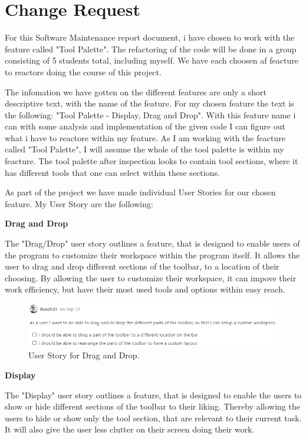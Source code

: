 \section{Change Request}
For this Software Maintenance report document, i have chosen to work with the feature called "Tool Palette".
The refactoring of the code will be done in a group consisting of 5 students total, including myself. We have each choosen af feacture to reactore doing the course of this project.

The infomation we have gotten on the different features are only a short descriptive text, with the name of the feature. For my chosen feature the text is the following: "Tool Palette - Display, Drag and Drop".
With this feature name i can with some analysis and implementation of the given code I can figure out what i have to reactore within my feature.
As I am working with the feacture called "Tool Palette", I will assume the whole of the tool palette is within my feacture. The tool palette after inspection looks to contain
tool sections, where it has different tools that one can select within these sections.

As part of the project we have made individual User Stories for our chosen feature. My User Story are the following:

\textbf{Drag and Drop}

The "Drag/Drop" user story outlines a feature, that is designed to enable users of the program to customize their workspace within the program itself.
It allows the user to drag and drop different sections of the toolbar, to a location of their choosing.
By allowing the user to customize their workspace, it can impove their work efficiency, but have their most used tools and options within easy reach.

\begin{figure}[htbp]
    \centering
    \includegraphics[width=\linewidth]{pic/Tool_palette_Drag_and_drop.png}
    \caption{User Story for Drag and Drop.}
    \label{fig:tool-palette-drag-drop}
\end{figure}

\textbf{Display}

The "Display" user story outlines a feature, that is designed to enable the users to show or hide different sections of the toolbar to their liking.
Thereby allowing the users to hide or show only the tool section, that are relevant to their current task. It will also give the user less clutter on their screen doing their work.


